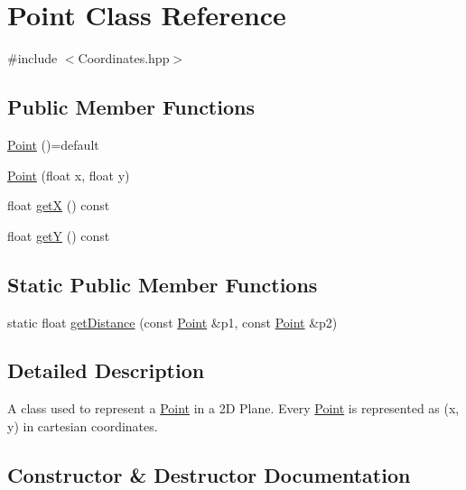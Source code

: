 \hypertarget{class_point}{}\section{Point Class Reference}
\label{class_point}


{\ttfamily \#include $<$Coordinates.\+hpp$>$}

\subsection*{Public Member Functions}
\begin{DoxyCompactItemize}
\item 
\hyperlink{class_point_a257415ad611a16bb73628efcdb87d0fd}{Point} ()=default
\item 
\hyperlink{class_point_a30bc8409287de4f43e160664be834636}{Point} (float x, float y)
\item 
float \hyperlink{class_point_a29c44ec7c7279e02629645a06cdaf7d5}{getX} () const
\item 
float \hyperlink{class_point_a2371ffadbe245d12a8f556d0a976521b}{getY} () const
\end{DoxyCompactItemize}
\subsection*{Static Public Member Functions}
\begin{DoxyCompactItemize}
\item 
static float \hyperlink{class_point_a1dbe2026f242cd96843ea14a67e8a2c3}{get\+Distance} (const \hyperlink{class_point}{Point} \&p1, const \hyperlink{class_point}{Point} \&p2)
\end{DoxyCompactItemize}


\subsection{Detailed Description}
A class used to represent a \hyperlink{class_point}{Point} in a 2D Plane. Every \hyperlink{class_point}{Point} is represented as (x, y) in cartesian coordinates. 

\subsection{Constructor \& Destructor Documentation}
\hypertarget{class_point_a257415ad611a16bb73628efcdb87d0fd}{}\label{class_point_a257415ad611a16bb73628efcdb87d0fd} 
